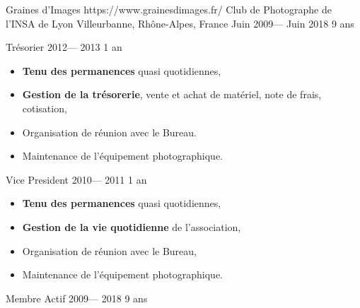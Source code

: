 \volunteerorganization%
{Graines d'Images}%
{https://www.grainesdimages.fr/}
{Club de Photographe de l’INSA de Lyon}
{Villeurbanne, Rhône-Alpes, France}%
{Juin 2009--- Juin 2018}%
{9 ans}

\volunteerposition%
{Trésorier}%
{2012--- 2013}%
{1 an}%
{
	\begin{itemize}
		\item \textbf{Tenu des permanences} quasi quotidiennes,
		\item \textbf{Gestion de la trésorerie}, vente et achat de matériel, note de frais, cotisation,
		\item Organisation de réunion avec le Bureau.
		\item Maintenance de l'équipement photographique.
	\end{itemize}
}

\volunteerposition%
{Vice President}%
{2010--- 2011}%
{1 an}%
{
	\begin{itemize}
		\item \textbf{Tenu des permanences} quasi quotidiennes,
		\item \textbf{Gestion de la vie quotidienne} de l'association,
		\item Organisation de réunion avec le Bureau,
		\item Maintenance de l'équipement photographique.
	\end{itemize}
}

\volunteerposition%
{Membre Actif}%
{2009--- 2018}%
{9 ans}%
{}
